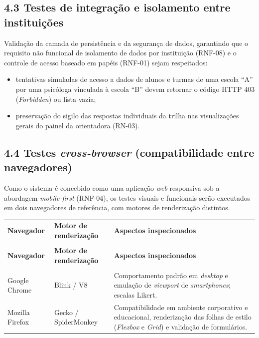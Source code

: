 \begin{apendicesenv}
\subsection*{4.3 Testes de integração e isolamento entre instituições}

Validação da camada de persistência e da segurança de dados, garantindo que o requisito não funcional de isolamento de dados por instituição (RNF-08) e o controle de acesso baseado em papéis (RNF-01) sejam respeitados:

\begin{itemize}
  \item tentativas simuladas de acesso a dados de alunos e turmas de uma escola ``A'' por uma psicóloga vinculada à escola ``B'' devem retornar o código HTTP 403 (\textit{Forbidden}) ou lista vazia;
  \item preservação do sigilo das respostas individuais da trilha nas visualizações gerais do painel da orientadora (RN-03).
\end{itemize}

\subsection*{4.4 Testes \textit{cross-browser} (compatibilidade entre navegadores)}

Como o sistema é concebido como uma aplicação \textit{web} responsiva sob a abordagem \textit{mobile-first} (RNF-04), os testes visuais e funcionais serão executados em dois navegadores de referência, com motores de renderização distintos.

{\ABNTEXfontereduzida
\renewcommand{\arraystretch}{1.25}
\begin{xltabular}{\textwidth}{|>{\raggedright\arraybackslash}p{3.4cm}|>{\raggedright\arraybackslash}p{3.6cm}|>{\raggedright\arraybackslash}X|}
 \\[0.3em]
\hline
\textbf{Navegador} & \textbf{Motor de renderização} & \textbf{Aspectos inspecionados} \\
\hline
\endfirsthead
{} \\
\hline
\textbf{Navegador} & \textbf{Motor de renderização} & \textbf{Aspectos inspecionados} \\
\hline
\endhead
{} \\
\endfoot
\endlastfoot
Google Chrome & Blink / V8 & Comportamento padrão em \textit{desktop} e emulação de \textit{viewport} de \textit{smartphones}; escalas Likert. \\
\hline
Mozilla Firefox & Gecko / SpiderMonkey & Compatibilidade em ambiente corporativo e educacional, renderização das folhas de estilo (\textit{Flexbox} e \textit{Grid}) e validação de formulários. \\
\hline
\end{xltabular}
}


\end{apendicesenv}
